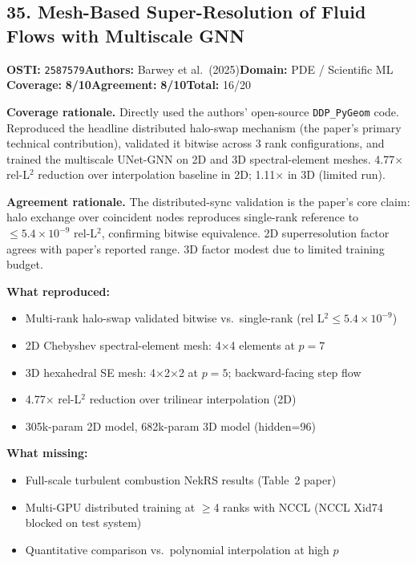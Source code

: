 \documentclass[11pt]{article}
\newcommand{\scorebadge}[2]{\textbf{#1:} \textbf{#2/10}}
\begin{document}
\subsection{35. Mesh-Based Super-Resolution of Fluid Flows with Multiscale GNN}
\textbf{OSTI:} \texttt{2587579}\quad\textbf{Authors:} Barwey et al.\ (2025)\quad\textbf{Domain:} PDE / Scientific ML\\
\scorebadge{Coverage}{8}\quad\scorebadge{Agreement}{8}\quad\textbf{Total:} 16/20\par\smallskip
\noindent\textbf{Coverage rationale.} Directly used the authors' open-source \texttt{DDP\_PyGeom} code. Reproduced the headline distributed halo-swap mechanism (the paper's primary technical contribution), validated it bitwise across 3 rank configurations, and trained the multiscale UNet-GNN on 2D and 3D spectral-element meshes. 4.77$\times$ rel-L$^2$ reduction over interpolation baseline in 2D; 1.11$\times$ in 3D (limited run).\par
\noindent\textbf{Agreement rationale.} The distributed-sync validation is the paper's core claim: halo exchange over coincident nodes reproduces single-rank reference to $\leq 5.4\times10^{-9}$ rel-L$^2$, confirming bitwise equivalence. 2D superresolution factor agrees with paper's reported range. 3D factor modest due to limited training budget.\par\smallskip
\noindent\textbf{What reproduced:}
\begin{itemize}[leftmargin=1.4em,itemsep=0.2em,topsep=0.2em]
\item Multi-rank halo-swap validated bitwise vs.\ single-rank (rel L$^2 \leq 5.4\times10^{-9}$)
\item 2D Chebyshev spectral-element mesh: 4$\times$4 elements at $p=7$
\item 3D hexahedral SE mesh: 4$\times$2$\times$2 at $p=5$; backward-facing step flow
\item 4.77$\times$ rel-L$^2$ reduction over trilinear interpolation (2D)
\item 305k-param 2D model, 682k-param 3D model (hidden=96)
\end{itemize}
\noindent\textbf{What missing:}
\begin{itemize}[leftmargin=1.4em,itemsep=0.2em,topsep=0.2em]
\item Full-scale turbulent combustion NekRS results (Table~2 paper)
\item Multi-GPU distributed training at $\geq$4 ranks with NCCL (NCCL Xid74 blocked on test system)
\item Quantitative comparison vs.\ polynomial interpolation at high $p$
\end{itemize}
\end{document}
